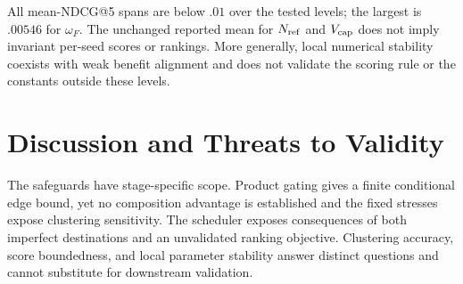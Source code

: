 \documentclass[runningheads]{llncs}
\begin{document}
\begin{table}[!htbp]
\centering\scriptsize
\caption{Candidate-4.1 one-at-a-time sensitivity of mean NDCG@5 to fixed
heuristic constants. Each range is the minimum--maximum mean over the tested
levels, including the reference level, on 40 test seeds. All spans are below
0.01 under the locked rerun.}
\label{tab:sensitivity}
\end{table}

All mean-NDCG@5 spans are below $.01$ over the tested levels; the largest is
$.00546$ for $\omega_F$. The unchanged reported mean for $N_{\rm ref}$ and
$V_{\rm cap}$ does not imply invariant per-seed scores or rankings. More
generally, local numerical stability coexists with weak benefit alignment and
does not validate the scoring rule or the constants outside these levels.

\section{Discussion and Threats to Validity}

The safeguards have stage-specific scope. Product gating gives a finite
conditional edge bound, yet no composition advantage is established and the
fixed stresses expose clustering sensitivity. The scheduler exposes
consequences of both imperfect destinations and an unvalidated ranking
objective. Clustering accuracy, score boundedness, and local parameter
stability answer distinct questions and cannot substitute for downstream
validation.
\end{document}
